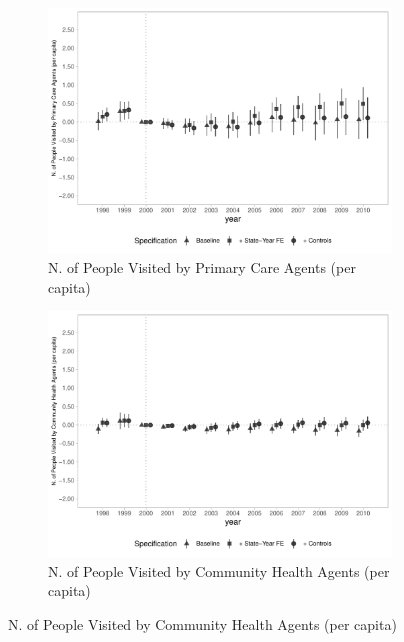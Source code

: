 \begin{figure}[h]
    \begin{center}
    \caption{Causal Effects on Primary Care Coverage - Intensive Margin}\label{fig:access2}
    \begin{subfigure}{0.32\textwidth}
        \caption{\scriptsize N. of People Visited by Primary Care Agents (per capita)}\label{fig:access2_a}
        \centering
        \includegraphics[width=\textwidth]{plots/access/siab_accomp_especif_pcapita_dist_ec29_baseline_dist_ec29_baseline_full.pdf}
    \end{subfigure}
    \begin{subfigure}{0.32\textwidth}
        \centering
        \caption{\scriptsize N. of People Visited by Community Health Agents (per capita)}\label{fig:iaccess2_b}
        \includegraphics[width=\textwidth]{plots/access/siab_accomp_especif_pacs_pcapita_dist_ec29_baseline_dist_ec29_baseline_full.pdf}

\end{subfigure}
\end{center}
\end{figure}
